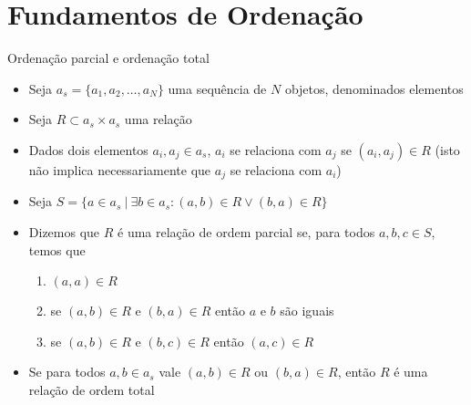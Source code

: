 \section{Fundamentos de Ordenação}

\begin{frame}[fragile]{Ordenação parcial e ordenação total}

    \begin{itemize}
        \item Seja $a_s = \lbrace a_1, a_2, \ldots, a_N\rbrace $ uma sequência de 
        $N$ objetos, denominados elementos

        \item Seja $R\subset a_s\times a_s$ uma relação 

        \item Dados dois elementos $a_i, a_j\in a_s$, $a_i$ se relaciona com $a_j$ se 
            $(a_i, a_j)\in R$ (isto não implica necessariamente que $a_j$ se relaciona com
            $a_i$)

        \item Seja $S = \lbrace a\in a_s\ | \ \exists b\in a_s : (a, b)\in R \vee (b, a)\in R
            \rbrace$

        \item Dizemos que $R$ é uma relação de ordem parcial se, para todos $a, b, c\in S$, 
            temos que
            \begin{enumerate}
                \item $(a, a)\in R$
                \item se $(a, b)\in R$ e $(b, a)\in R$ então $a$ e $b$ são iguais
                \item se $(a, b)\in R$ e $(b, c)\in R$ então $(a, c)\in R$
            \end{enumerate}

        \item Se para todos $a, b\in a_s$ vale $(a, b)\in R$ ou $(b, a)\in R$, então $R$ é uma
            relação de ordem total
    \end{itemize}

\end{frame}

